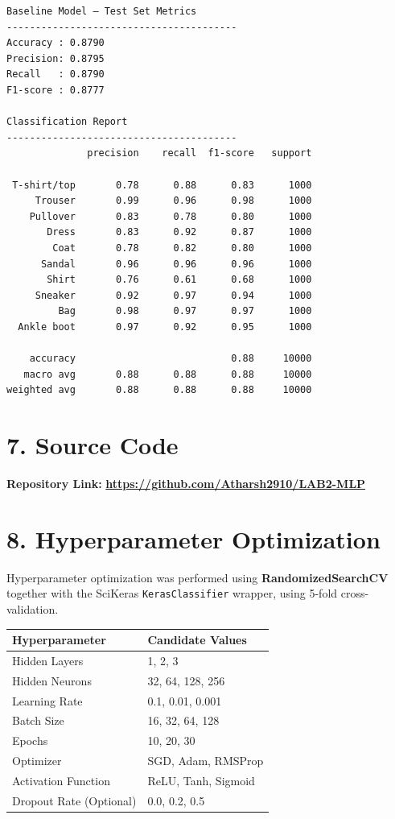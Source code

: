 \documentclass[11pt]{article}
\begin{document}
\begin{lstlisting}[style=output]
Baseline Model — Test Set Metrics
----------------------------------------
Accuracy : 0.8790
Precision: 0.8795
Recall   : 0.8790
F1-score : 0.8777

Classification Report
----------------------------------------
              precision    recall  f1-score   support

 T-shirt/top       0.78      0.88      0.83      1000
     Trouser       0.99      0.96      0.98      1000
    Pullover       0.83      0.78      0.80      1000
       Dress       0.83      0.92      0.87      1000
        Coat       0.78      0.82      0.80      1000
      Sandal       0.96      0.96      0.96      1000
       Shirt       0.76      0.61      0.68      1000
     Sneaker       0.92      0.97      0.94      1000
         Bag       0.98      0.97      0.97      1000
  Ankle boot       0.97      0.92      0.95      1000

    accuracy                           0.88     10000
   macro avg       0.88      0.88      0.88     10000
weighted avg       0.88      0.88      0.88     10000
\end{lstlisting}

\section*{7. Source Code}
\textbf{Repository Link:}
\textbf{\url{https://github.com/Atharsh2910/LAB2-MLP}
}
\section*{8. Hyperparameter Optimization}
Hyperparameter optimization was performed using \textbf{RandomizedSearchCV} together with the SciKeras \texttt{KerasClassifier} wrapper, using 5-fold cross-validation.

\begin{center}
\begin{tabular}{|p{5cm}|p{7cm}|}
\hline
Hyperparameter & Candidate Values\\
\hline
Hidden Layers & 1, 2, 3\\
Hidden Neurons & 32, 64, 128, 256\\
Learning Rate & 0.1, 0.01, 0.001\\
Batch Size & 16, 32, 64, 128\\
Epochs & 10, 20, 30\\
Optimizer & SGD, Adam, RMSProp\\
Activation Function & ReLU, Tanh, Sigmoid\\
Dropout Rate (Optional) & 0.0, 0.2, 0.5\\
\hline
\end{tabular}
\end{center}
\end{document}
